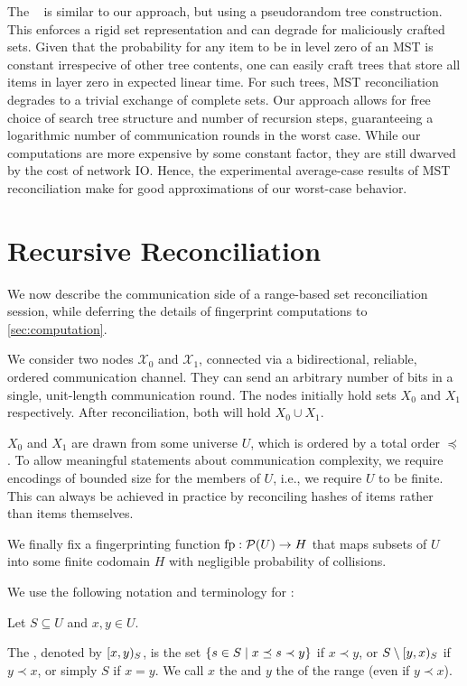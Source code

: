 \documentclass[conference]{IEEEtran}
\newcommand{\peer}[1]{\ensuremath{\mathcal{X}_{#1}}}
\begin{document}
The ~\cite{auvolat2019merkle} is similar to our approach, but using a pseudorandom tree construction. This enforces a rigid set representation and can degrade for maliciously crafted sets. Given that the probability for any item to be in level zero of an MST is constant irrespecive of other tree contents, one can easily craft trees that store all items in layer zero in expected linear time. For such trees, MST reconciliation degrades to a trivial exchange of complete sets. Our approach allows for free choice of search tree structure and number of recursion steps, guaranteeing a logarithmic number of communication rounds in the worst case. While our computations are more expensive by some constant factor, they are still dwarved by the cost of network IO. Hence, the experimental average-case results of MST reconciliation make for good approximations of our worst-case behavior.

\section{Recursive Reconciliation}\label{reconciliation}

We now describe the communication side of a range-based set reconciliation session, while deferring the details of fingerprint computations to \cref{sec:computation}. 

We consider two nodes \peer{0} and \peer{1}, connected via a bidirectional, reliable, ordered communication channel. They can send an arbitrary number of bits in a single, unit-length communication round. The nodes initially hold sets $X_0$ and $X_1$ respectively. After reconciliation, both will hold $X_0 \cup X_1$.

$X_0$ and $X_1$ are drawn from some universe $U$, which is ordered by a total order $\preceq$. To allow meaningful statements about communication complexity, we require encodings of bounded size for the members of $U$, i.e., we require $U$ to be finite. This can always be achieved in practice by reconciling hashes of items rather than items themselves.

We finally fix a fingerprinting function ${\operatorname{fp}}: {\mathcal{P}({U})} \rightarrow {H}$ that maps subsets of $U$ into some finite codomain $H$ with negligible probability of collisions.

We use the following notation and terminology for :

\begin{definition}
\label{def:ranges}
Let $S \subseteq U$  and $x, y \in U$.

The , denoted by $[{x},{y})_{S}$, is the set $\{s \in S \mid x \preceq s \prec y\}$ if $x \prec y$, or $S \setminus [{y},{x})_{S}$ if $y \prec x$, or simply $S$ if $x = y$. We call $x$ the  and $y$ the  of the range (even if $y \prec x$).
\end{definition}
\end{document}
